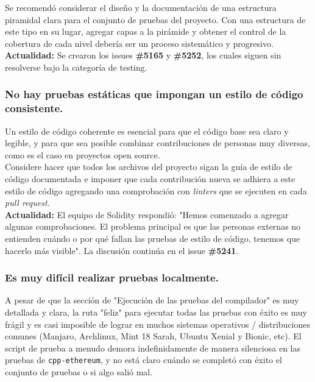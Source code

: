 Se recomendó considerar el diseño y la documentación de una estructura piramidal clara para el conjunto de pruebas del proyecto. Con una estructura de este tipo en su lugar, agregar capas a la pirámide y obtener el control de la cobertura de cada nivel debería ser un proceso sistemático y progresivo.\\

\textbf{Actualidad: }Se crearon los issues \textbf{\#5165}\cite{GHI5165} y \textbf{\#5252}\cite{GHI5252}, los cuales siguen sin resolverse bajo la categoría de testing.

\subsubsection{No hay pruebas estáticas que impongan un estilo de código consistente.}

Un estilo de código coherente es esencial para que el código base sea claro y legible, y para que sea posible combinar contribuciones de personas muy diversas, como es el caso en proyectos open source.\\

Considere hacer que todos los archivos del proyecto sigan la guía de estilo de código documentada\cite{SolidityStyleGuide} e imponer que cada contribución nueva se adhiera a este estilo de código agregando una comprobación con \textit{linters} que se ejecuten en cada \textit{pull request}.\\

\textbf{Actualidad:} El equipo de Solidity respondió: "Hemos comenzado a agregar algunas comprobaciones. El problema principal es que las personas externas no entienden cuándo o por qué fallan las pruebas de estilo de código, tenemos que hacerlo más visible". La discusión continúa en el issue \textbf{\#5241}.

\subsubsection{Es muy difícil realizar pruebas localmente.}
A pesar de que la sección de "Ejecución de las pruebas del compilador"\cite{SolidityContributingTests} es muy detallada y clara, la ruta "feliz" para ejecutar todas las pruebas con éxito es muy frágil y es casi imposible de lograr en muchos sistemas operativos / distribuciones comunes (Manjaro, Archlinux, Mint 18 Sarah, Ubuntu Xenial y Bionic, etc). El script de prueba a menudo demora indefinidamente de manera silenciosa en las pruebas de \verb|cpp-ethereum|, y no está claro cuándo se completó con éxito el conjunto de pruebas o si algo salió mal.\\

